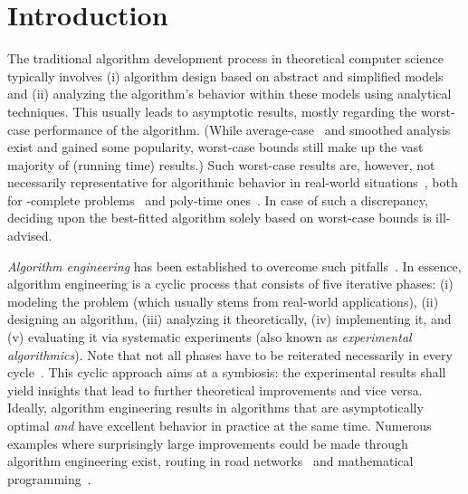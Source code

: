 \documentclass[algorithms,article,submit,moreauthors,pdftex]{Definitions/mdpi}
\newcommand{\changed}[1]{#1}
\begin{document}
\maketitle
\section{Introduction}
\label{sec:intro}
The traditional algorithm development process in theoretical computer science typically involves
(i) algorithm design based on abstract and simplified models and
(ii) analyzing the algorithm's behavior within these models using analytical techniques.
%
This usually leads to asymptotic results, mostly regarding the worst-case performance of the algorithm.
(While average-case~\cite{TCS-004} and smoothed analysis~\cite{Spielman:2001:SAA:380752.380813} exist and gained some popularity,
worst-case bounds still make up the vast majority of
\changed{(\eg running time)} results.)
Such worst-case results are, however, not necessarily representative for algorithmic behavior in real-world situations~\cite{DBLP:journals/cacm/Roughgarden19}, both for \NP-complete problems~\cite{HeuleJS18sat,Applegate:2007:TSP:1374811} and poly-time ones~\cite{mehlhorn2008algorithms,Puglisi:2007:TSA:1242471.1242472}.
%
In case of such a discrepancy, deciding upon the best-fitted algorithm solely based on worst-case bounds is ill-advised.

\emph{Algorithm engineering} has been established to overcome such pitfalls~\cite{Johnson99,Muller-Hannemann10,Moret}.
In essence, algorithm engineering is a cyclic process that consists of five iterative phases:
(i) modeling the problem (which usually stems from real-world applications),
(ii) designing an algorithm, (iii) analyzing it theoretically, (iv) implementing it, and
(v) evaluating it via systematic experiments (also known as \emph{experimental algorithmics}).
Note that not all phases have to be reiterated necessarily in every cycle~\cite{Sanders10}.
This cyclic approach aims at a symbiosis: the experimental results shall yield insights that lead to further theoretical improvements and vice versa.
Ideally, algorithm engineering results in algorithms that are asymptotically optimal \emph{and} have excellent behavior in practice at the same time.
%
Numerous examples where surprisingly large improvements could be made through algorithm engineering exist,
\eg routing in road networks~\cite{bast2016route} and mathematical programming~\cite{applegate2006traveling}.
\end{document}

